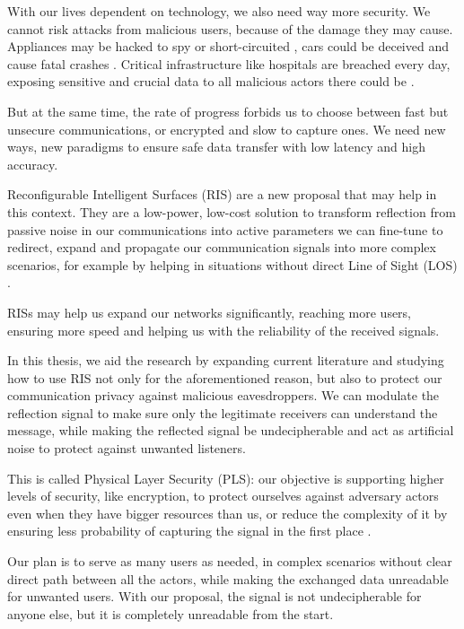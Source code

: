 With our lives dependent on technology, we also need way more security. We cannot risk attacks from malicious users, because of the damage they may cause. Appliances may be hacked to spy or short-circuited \cite{Inside-the-Smart-Home-IoT-Device-Threats-and-Attack-Scenarios}, cars could be deceived and cause fatal crashes \cite{CAV-attack}. Critical infrastructure like hospitals are breached every day, exposing sensitive and crucial data to all malicious actors there could be \cite{Cyberattacks-in-healthcare}.

But at the same time, the rate of progress forbids us to choose between fast but unsecure communications, or encrypted and slow to capture ones. We need new ways, new paradigms to ensure safe data transfer with low latency and high accuracy.

Reconfigurable Intelligent Surfaces (RIS) are a new proposal that may help in this context. They are a low-power, low-cost solution to transform reflection from passive noise in our communications into active parameters we can fine-tune to redirect, expand and propagate our communication signals into more complex scenarios, for example by helping in situations without direct Line of Sight (LOS) \cite{SEGATA2024110443}.

RISs may help us expand our networks significantly, reaching more users, ensuring more speed and helping us with the reliability of the received signals.

In this thesis, we aid the research by expanding current literature and studying how to use RIS not only for the aforementioned reason, but also to protect our communication privacy against malicious eavesdroppers. We can modulate the reflection signal to make sure only the legitimate receivers can understand the message, while making the reflected signal be undecipherable and act as artificial noise to protect against unwanted listeners.

This is called Physical Layer Security (PLS): our objective is supporting higher levels of security, like encryption, to protect ourselves against adversary actors even when they have bigger resources than us, or reduce the complexity of it by ensuring less probability of capturing the signal in the first place \cite{5751298}.

Our plan is to serve as many users as needed, in complex scenarios without clear direct path between all the actors, while making the exchanged data unreadable for unwanted users. With our proposal, the signal is not undecipherable for anyone else, but it is completely unreadable from the start.

